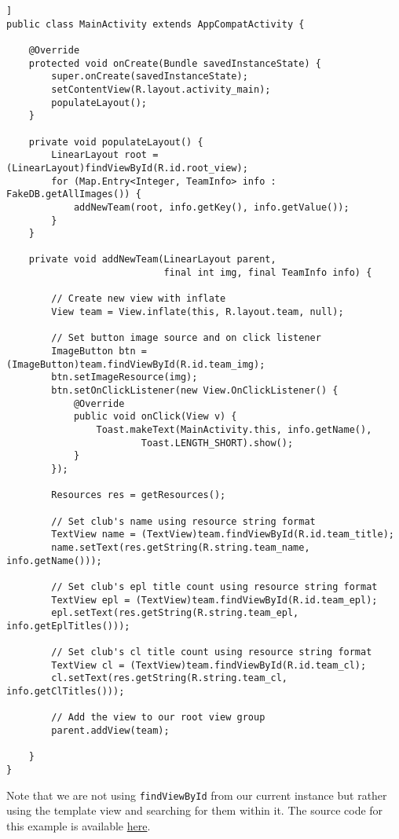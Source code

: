 \begin{lstlisting}[style=A_Java, caption={Layout inflation in Java}, label={listing:javainfl}]]
public class MainActivity extends AppCompatActivity {

    @Override
    protected void onCreate(Bundle savedInstanceState) {
        super.onCreate(savedInstanceState);
        setContentView(R.layout.activity_main);
        populateLayout();
    }

    private void populateLayout() {
        LinearLayout root = (LinearLayout)findViewById(R.id.root_view);
        for (Map.Entry<Integer, TeamInfo> info : FakeDB.getAllImages()) {
            addNewTeam(root, info.getKey(), info.getValue());
        }
    }

    private void addNewTeam(LinearLayout parent,
                            final int img, final TeamInfo info) {

        // Create new view with inflate
        View team = View.inflate(this, R.layout.team, null);

        // Set button image source and on click listener
        ImageButton btn = (ImageButton)team.findViewById(R.id.team_img);
        btn.setImageResource(img);
        btn.setOnClickListener(new View.OnClickListener() {
            @Override
            public void onClick(View v) {
                Toast.makeText(MainActivity.this, info.getName(),
                        Toast.LENGTH_SHORT).show();
            }
        });

        Resources res = getResources();

        // Set club's name using resource string format
        TextView name = (TextView)team.findViewById(R.id.team_title);
        name.setText(res.getString(R.string.team_name, info.getName()));

        // Set club's epl title count using resource string format
        TextView epl = (TextView)team.findViewById(R.id.team_epl);
        epl.setText(res.getString(R.string.team_epl, info.getEplTitles()));

        // Set club's cl title count using resource string format
        TextView cl = (TextView)team.findViewById(R.id.team_cl);
        cl.setText(res.getString(R.string.team_cl, info.getClTitles()));

        // Add the view to our root view group
        parent.addView(team);

    }
}
\end{lstlisting}

Note that we are not using \texttt{findViewById} from our current instance but rather using the template view and searching for them within it. The source code for this example is available \href{https://github.com/JonSteinn/AndroidDevelopment/tree/master/examples/lab3/inflator}{here}.

